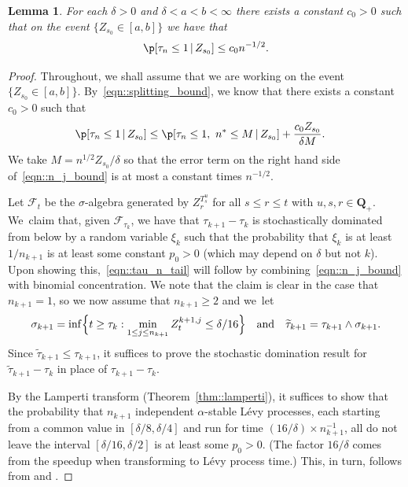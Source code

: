 \documentclass[JEP,XML,SOM,Unicode]{cedram}
\let\mathcal\mathscr
\theoremstyle{plain}
\numberwithin{theorem}{section}
\newtheorem{lemma}[theorem]{Lemma}
\theoremstyle{definition}
\newcommand{\CF}{{\mathcal F}}
\newcommand{\Q}{{\mathbf Q}}
\let\wt\widetilde
\newcommand{\giv}{\,|\,}
\begin{document}
\begin{lemma}
\label{lem::number_of_splittings_bound}
For each $\delta > 0$ and $\delta < a < b < \infty$ there exists a constant $c_0 > 0$ such that on the event $\{ Z_{s_0} \in [a,b]\}$ we have that
\begin{equation}
\label{eqn::tau_n_tail}
\p[ \tau_n \leq 1 \giv Z_{s_0}] \leq c_0 n^{-1/2}.
\end{equation}
\end{lemma}
\begin{proof}
Throughout, we shall assume that we are working on the event $\{ Z_{s_0} \in [a,b]\}$. By~\eqref{eqn::splitting_bound}, we know that there exists a constant $c_0 > 0$ such that
\begin{align}
\p[ \tau_n \leq 1 \giv Z_{s_0}]
&\leq \p[ \tau_n \leq 1,\ n^* \leq M \giv Z_{s_0}] + \frac{c_0 Z_{s_0}}{\delta M}. \label{eqn::n_j_bound}
\end{align}
We take $M = n^{1/2} Z_{s_0}/\delta$ so that the error term on the right hand side of~\eqref{eqn::n_j_bound} is at most a constant times $n^{-1/2}$.

Let $\CF_t$ be the $\sigma$-algebra generated by $Z_r^{T_s^u}$ for all $s \leq r \leq t$ with $u,s,r \in \Q_+$. We~claim that, given $\CF_{\tau_k}$, we have that $\tau_{k+1} - \tau_k$ is stochastically dominated from below by a random variable $\xi_k$ such that the probability that $\xi_k$ is at least $1/n_{k+1}$ is at least some constant $p_0 > 0$ (which may depend on $\delta$ but not $k$). Upon showing this,~\eqref{eqn::tau_n_tail} will follow by combining~\eqref{eqn::n_j_bound} with binomial concentration. We note that the claim is clear in the case that $n_{k+1}=1$, so we now assume that $n_{k+1} \geq 2$ and we~let
\[
\sigma_{k+1} = \inf\Bigl\{ t \geq \tau_k : \min_{1 \leq j \leq n_{k+1}} Z_t^{k+1,j} \leq \delta/16 \Bigr\} \quad\text{and}\quad \wt{\tau}_{k+1} = \tau_{k+1} \wedge \sigma_{k+1}.
\]
Since $\wt{\tau}_{k+1} \leq \tau_{k+1}$, it suffices to prove the stochastic domination result for $\wt{\tau}_{k+1}-\tau_k$ in place of $\tau_{k+1}-\tau_k$.

By the Lamperti transform (Theorem~\ref{thm::lamperti}), it suffices to show that the probability that $n_{k+1}$ independent $\alpha$-stable Lévy processes, each starting from a common value in $[\delta/8,\delta/4]$ and run for time $(16/\delta) \times n_{k+1}^{-1}$, all do not leave the interval $[\delta/16,\delta/2]$ is at least some $p_0 > 0$. (The factor $16/\delta$ comes from the speedup when transforming to Lévy process time.) This, in turn, follows from \cite[Chap.\,VII, Cor.\,2]{bertoinlevybook} and \cite[Chap.\,VIII, Prop.\,4]{bertoinlevybook}.
\end{proof}
\end{document}
